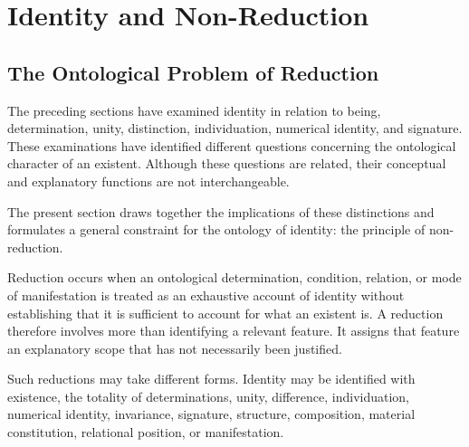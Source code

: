 %
%
%
%

\section{Identity and Non-Reduction}
\label{sec:identity-and-non-reduction}

\subsection{The Ontological Problem of Reduction}

The preceding sections have examined identity in relation to
being, determination, unity, distinction, individuation,
numerical identity, and signature. These examinations have
identified different questions concerning the ontological
character of an existent. Although these questions are related,
their conceptual and explanatory functions are not interchangeable.

The present section draws together the implications of these
distinctions and formulates a general constraint for the
ontology of identity: the principle of non-reduction.

Reduction occurs when an ontological determination, condition,
relation, or mode of manifestation is treated as an exhaustive
account of identity without establishing that it is sufficient
to account for what an existent is. A reduction therefore
involves more than identifying a relevant feature. It assigns
that feature an explanatory scope that has not necessarily
been justified.

Such reductions may take different forms. Identity may be
identified with existence, the totality of determinations,
unity, difference, individuation, numerical identity,
invariance, signature, structure, composition, material
constitution, relational position, or manifestation.

